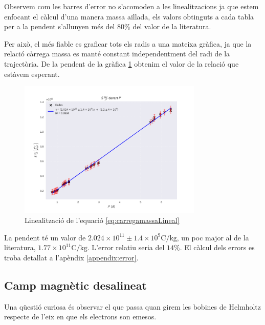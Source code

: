 \documentclass[11pt]{article}
\begin{document}
    Observem com les barres d'error no s'acomoden a les linealitzacions ja que estem enfocant el càlcul d'una manera massa aïllada, els valors obtinguts a cada tabla per a la pendent s'allunyen més del 80\% del valor de la literatura.
    
    \clearpage
    Per això, el més fiable es graficar tots els radis a una mateixa gràfica, ja que la relació càrrega massa es manté constant independentment del radi de la trajectòria. De la pendent de la gràfica \ref{fig:1graph} obtenim el valor de la relació que estàvem esperant.

    \vspace{-0.5cm}
    \begin{figure}[h]
        \centering
        \includegraphics[width=0.78\textwidth]{fotos/1graph.png}
        \caption{Linealització de l'equació \ref{eq:carregamassaLineal}}
        \label{fig:1graph}
    \end{figure}

    La pendent té un valor de $2.024\times10^{11} \pm 1.4\times10^9\si{\coulomb}/\si{\kilogram}$, un poc major al de la literatura, $1.77\times10^{11}\si{\coulomb}/\si{\kilogram}$. L'error relatiu seria del $14\%$. El càlcul dels errors es troba detallat a l'apèndix \ref{appendix:error}.
    \subsection{Camp magnètic desalineat}
        Una qüestió curiosa és observar el que passa quan girem les bobines de Helmholtz respecte de l'eix en que els electrons son emesos.
\end{document}
